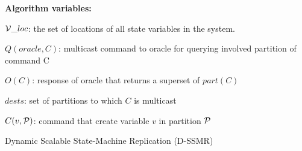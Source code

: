 \begin{algorithm}
\begin{distribalgo}[1]

			

\vspace{1.5mm}

\textbf{Algorithm variables:}

\vspace{1mm}

$\mathcal{V}\_loc$: the set of locations of all state variables in the system.

\vspace{1mm}

$Q(oracle, C)$: multicast command to oracle for querying involved partition of command C

\vspace{1mm}

$O(C)$: response of oracle that returns a superset of $part(C)$

\vspace{1mm}

$dests$: set of partitions to which $C$ is multicast

\vspace{1mm}

$C(v, \mathcal{P})$: command that create variable $v$ in partition $\mathcal{P}$









\caption{Dynamic Scalable State-Machine Replication (D-SSMR)}
\label{alg:dssmr}
\end{distribalgo}
\end{algorithm}

